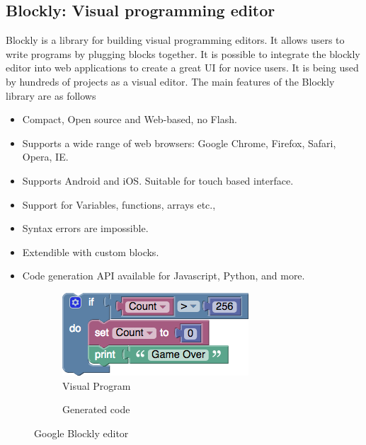 \subsection{Blockly: Visual programming editor}
Blockly \cite{Blockly} is a library for building visual programming editors. It allows users to write programs by plugging blocks together. It is possible to integrate the blockly editor into web applications to create a great UI for novice users. It is being used by hundreds of projects as a visual editor. The main features of the Blockly library are as follows
\begin{itemize}[leftmargin={1cm},topsep={0pt},itemsep={0pt},partopsep={0pt},parsep={0pt}] 
\item Compact, Open source and Web-based, no Flash.
\item Supports a wide range of web browsers: Google Chrome, Firefox, Safari, Opera, IE.
\item Supports Android and iOS. Suitable for touch based interface.
\item Support for Variables, functions, arrays etc.,
\item Syntax errors are impossible.
\item Extendible with custom blocks.
\item Code generation API available for Javascript, Python, and more.
\end{itemize}
\begin{figure}[H]
\begin{subfigure}[h]{0.4\textwidth}
\includegraphics[width=\textwidth]{assets/blockly_sample.png}
\caption[Visual Program]{Visual Program}
\label{fig:blockly_sample}
\end{subfigure}
\hfill
\begin{subfigure}[h]{0.48\textwidth}

\caption[Generated code]{Generated code}
\label{fig:blockly_sample_code}
\end{subfigure}
\caption[Google Blockly editor]{Google Blockly editor}
\label{fig:pseudo_nodes}
\end{figure}
